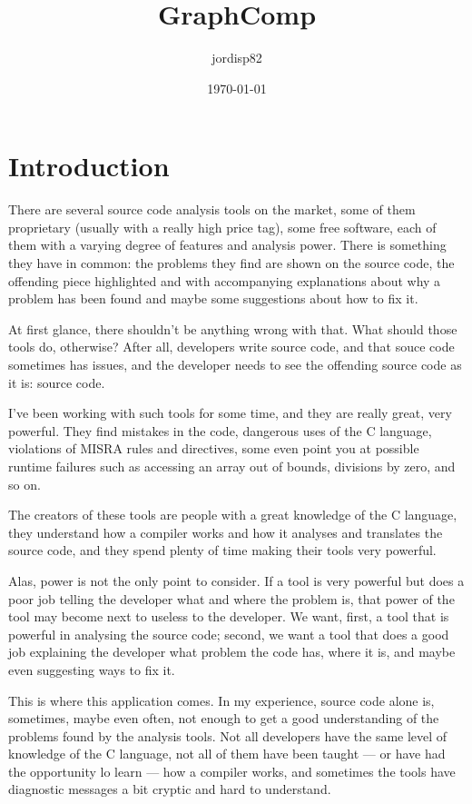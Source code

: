 \documentclass[a4paper,openany]{refrep}
\title{GraphComp}
\author{jordisp82}
\date{\today}
\begin{document}
\maketitle
\pagestyle{plain}
\tableofcontents

\chapter{Introduction}
There are several source code analysis tools on the market, some of them proprietary (usually with a really high price tag), some free software, each of them with a varying degree of features and analysis power. There is something they have in common: the problems they find are shown on the source code, the offending piece highlighted and with accompanying explanations about why a problem has been found and maybe some suggestions about how to fix it.

At first glance, there shouldn't be anything wrong with that. What should those tools do, otherwise? After all, developers write source code, and that souce code sometimes has issues, and the developer needs to see the offending source code as it is: source code.

I've been working with such tools for some time, and they are really great, very powerful. They find mistakes in the code, dangerous uses of the C language, violations of MISRA rules and directives, some even point you at possible runtime failures such as accessing an array out of bounds, divisions by zero, and so on.

The creators of these tools are people with a great knowledge of the C language, they understand how a compiler works and how it analyses and translates the source code, and they spend plenty of time making their tools very powerful.

Alas, power is not the only point to consider. If a tool is very powerful but does a poor job telling the developer what and where the problem is, that power of the tool may become next to useless to the developer. We want, first, a tool that is powerful in analysing the source code; second, we want a tool that does a good job explaining the developer what problem the code has, where it is, and maybe even suggesting ways to fix it.

This is where this application comes. In my experience, source code alone is, sometimes, maybe even often, not enough to get a good understanding of the problems found by the analysis tools. Not all developers have the same level of knowledge of the C language, not all of them have been taught --- or have had the opportunity lo learn --- how a compiler works, and sometimes the tools have diagnostic messages a bit cryptic and hard to understand.
\end{document}
